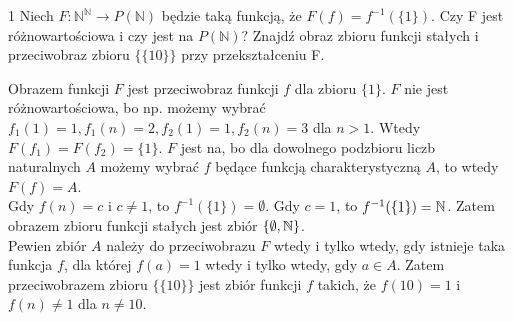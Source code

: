 \documentclass{../note}
\begin{document}
\begin{zadanie}{1}
Niech $F:\mathbb{N}^{\mathbb{N}}\rightarrow P(\mathbb{N})$ będzie taką funkcją, że $F(f)=f^{-1}(\{1\})$. Czy F jest różnowartościowa i czy jest na $P(\mathbb{N})?$ Znajdź obraz zbioru funkcji stałych i przeciwobraz zbioru $\{\{10\}\}$ przy przekształceniu F.
\end{zadanie}
\begin{rozwiazanie}
Obrazem funkcji $F$ jest przeciwobraz funkcji $f$ dla zbioru $\{1\}$. $F$ nie jest różnowartościowa, bo np. możemy wybrać $f_1(1) = 1, f_1(n) = 2, f_2(1) = 1, f_2(n) = 3$ dla $n > 1$. Wtedy $F(f_1) = F(f_2) = \{1\}$. $F$ jest na, bo dla dowolnego podzbioru liczb naturalnych $A$ możemy wybrać $f$ będące funkcją charakterystyczną $A$, to wtedy $F(f) = A$.\\
Gdy $f(n) = c$ i $c \ne 1$, to $f^{-1}(\{1\}) = \emptyset$. Gdy $c = 1$, to $f^{-1}(\{1\}) = \mathbb{N}$. Zatem obrazem zbioru funkcji stałych jest zbiór $\{\emptyset, \mathbb{N}\}$.\\
Pewien zbiór $A$ należy do przeciwobrazu $F$ wtedy i tylko wtedy, gdy istnieje taka funkcja $f$, dla której $f(a) = 1$ wtedy i tylko wtedy, gdy $a \in A$. Zatem przeciwobrazem zbioru $\{\{10\}\}$ jest zbiór funkcji $f$ takich, że $f(10) = 1$ i $f(n) \ne 1$ dla $n \ne 10$.
\end{rozwiazanie}
\end{document}
